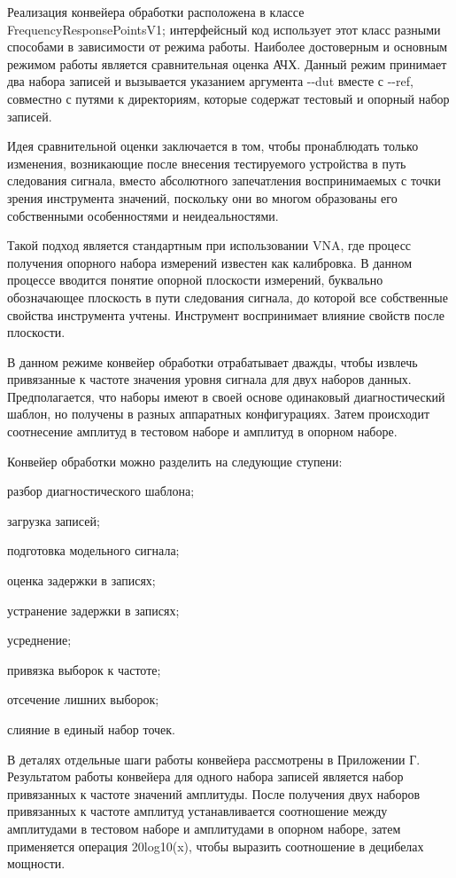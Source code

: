\documentclass{report}
\begin{document}
Реализация конвейера обработки расположена в классе FrequencyResponsePointsV1; интерфейсный код использует этот класс разными способами в зависимости от режима работы.
Наиболее достоверным и основным режимом работы является сравнительная оценка АЧХ. Данный режим принимает два набора записей и вызывается указанием аргумента -{}-dut вместе с -{}-ref, совместно с путями к директориям, которые содержат тестовый и опорный набор записей.

Идея сравнительной оценки заключается в том, чтобы пронаблюдать только изменения, возникающие после внесения тестируемого устройства в путь следования сигнала, вместо абсолютного запечатления воспринимаемых с точки зрения инструмента значений, поскольку они во многом образованы его собственными особенностями и неидеальностями.

Такой подход является стандартным при использовании VNA, где процесс получения опорного набора измерений известен как калибровка. В данном процессе вводится понятие опорной плоскости измерений, буквально обозначающее плоскость в пути следования сигнала, до которой все собственные свойства инструмента учтены. Инструмент воспринимает влияние свойств после плоскости.

В данном режиме конвейер обработки отрабатывает дважды, чтобы извлечь привязанные к частоте значения уровня сигнала для двух наборов данных. Предполагается, что наборы имеют в своей основе одинаковый диагностический шаблон, но получены в разных аппаратных конфигурациях. Затем происходит соотнесение амплитуд в тестовом наборе и амплитуд в опорном наборе.

Конвейер обработки можно разделить на следующие ступени:

\begin{enummarker}
    \item разбор диагностического шаблона;
    \item загрузка записей;
    \item подготовка модельного сигнала;
    \item оценка задержки в записях;
    \item устранение задержки в записях;
    \item усреднение;
    \item привязка выборок к частоте;
    \item отсечение лишних выборок;
    \item слияние в единый набор точек.
\end{enummarker}

В деталях отдельные шаги работы конвейера рассмотрены в Приложении Г. Результатом работы конвейера для одного набора записей является набор привязанных к частоте значений амплитуды. После получения двух наборов привязанных к частоте амплитуд устанавливается соотношение между амплитудами в тестовом наборе и амплитудами в опорном наборе, затем применяется операция 20log10(x), чтобы выразить соотношение в децибелах мощности.
\end{document}
